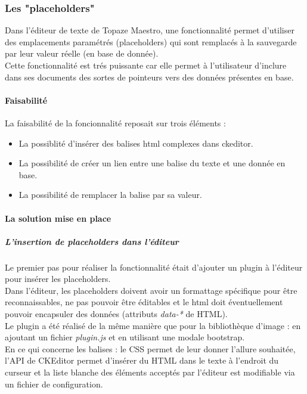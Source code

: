 \subsubsection{Les "placeholders"}
Dans l'éditeur de texte de Topaze Maestro, une fonctionnalité permet d'utiliser des emplacements paramétrés (placeholders) qui sont remplacés à la sauvegarde par leur valeur réelle (en base de donnée). \\
Cette fonctionnalité est trés puissante car elle permet à l'utilisateur d'inclure dans ses documents des sortes de pointeurs vers des données présentes en base. \\

\paragraph*{Faisabilité\\}
La faisabilité de la foncionnalité reposait sur trois éléments : %
\begin{itemize}
\item La possiblité d'insérer des balises html complexes dans ckeditor.
\item La possibilité de créer un lien entre une balise du texte et une donnée en base.
\item La possibilité de remplacer la balise par sa valeur.
\end{itemize}

\paragraph*{La solution mise en place}
\subparagraph*{L'insertion de placeholders dans l'éditeur}
Le premier pas pour réaliser la fonctionnalité était d'ajouter un plugin à l'éditeur pour insérer les placeholders.\\
Dans l'éditeur, les placeholders doivent avoir un formattage spécifique pour être reconnaissables, ne pas pouvoir être éditables et le html doit éventuellement pouvoir encapsuler des données (attributs \textit{data-*} de HTML).\\

Le plugin a été réalisé de la même manière que pour la bibliothèque d'image : en ajoutant un fichier \textit{plugin.js} et en utilisant une modale bootstrap.\\
En ce qui concerne les balises : le CSS permet de leur donner l'allure souhaitée, l'API de CKEditor permet d'insérer du HTML dans le texte à l'endroit du curseur et la liste blanche des éléments acceptés par l'éditeur est modifiable via un fichier de configuration.

